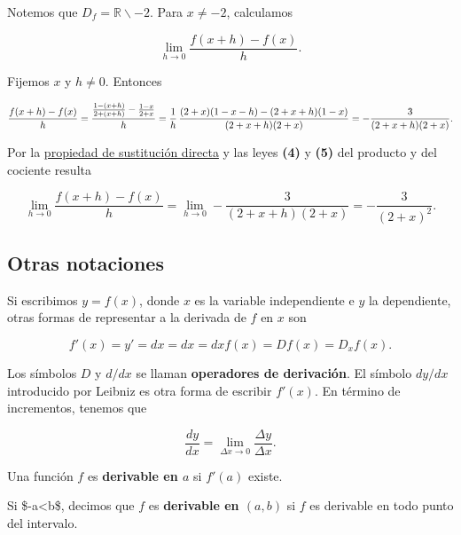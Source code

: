 \documentclass[
  letterpaper,
]{book}
\theoremstyle{plain}
\theoremstyle{remark}
\begin{document}
\begin{tcolorbox}[enhanced jigsaw, opacityback=0, left=2mm, opacitybacktitle=0.6, toprule=.15mm, bottomrule=.15mm, colbacktitle=quarto-callout-tip-color!10!white, titlerule=0mm, bottomtitle=1mm, title=\textcolor{quarto-callout-tip-color}{\faLightbulb}\hspace{0.5em}{Solución}, toptitle=1mm, colframe=quarto-callout-tip-color-frame, colback=white, breakable, rightrule=.15mm, arc=.35mm, leftrule=.75mm, coltitle=black]

Notemos que \(D_f=\mathbb{R}\backslash {-2}\). Para \(x\neq -2\),
calculamos

\[
\lim_{h\to 0} \frac{f(x+h)-f(x)}{h}.
\]

Fijemos \(x\) y \(h\neq 0\). Entonces

\[ \small
\frac{f(x+h)-f(x)}{h}=\frac{\frac{1-(x+h)}{2+(x+h)}-\frac{1-x}{2+x}}{h}=\frac{1}{h}\, \frac{(2+x)(1-x-h)-(2+x+h)(1-x)}{(2+x+h)(2+x)}=-\frac{3}{(2+x+h)(2+x)}.
\]

Por la \hyperref[teo-sust-directa]{propiedad de sustitución directa} y
las leyes \textbf{(4)} y \textbf{(5)} del producto y del cociente
resulta

\[
\lim_{h\to 0} \frac{f(x+h)-f(x)}{h}=\lim_{h\to 0} -\frac{3}{(2+x+h)(2+x)}=-\frac{3}{(2+x)^2}.
\]

\end{tcolorbox}

\subsection{Otras notaciones}\label{otras-notaciones}

Si escribimos \(y=f(x)\), donde \(x\) es la variable independiente e
\(y\) la dependiente, otras formas de representar a la derivada de \(f\)
en \(x\) son

\[
f'(x)=y'={dx}={dx}={dx}f(x)=Df(x)=D_xf(x).
\]

Los símbolos \(D\) y \(d/dx\) se llaman \textbf{operadores de
derivación}. El símbolo \(dy/dx\) introducido por Leibniz es otra forma
de escribir \(f'(x)\). En término de incrementos, tenemos que

\[
\frac{dy}{dx}=\lim_{\Delta x\to 0} \frac{\Delta y}{\Delta x}.
\]

\begin{tcolorbox}[enhanced jigsaw, opacityback=0, left=2mm, opacitybacktitle=0.6, toprule=.15mm, bottomrule=.15mm, colbacktitle=quarto-callout-note-color!10!white, titlerule=0mm, bottomtitle=1mm, title=\textcolor{quarto-callout-note-color}{\faInfo}\hspace{0.5em}{Definición (Función derivable)}, toptitle=1mm, colframe=quarto-callout-note-color-frame, colback=white, breakable, rightrule=.15mm, arc=.35mm, leftrule=.75mm, coltitle=black]

Una función \(f\) es \textbf{derivable en \(a\)} si \(f'(a)\) existe.

Si \$-\infty\leq a\textless b\leq \infty \$, decimos que \(f\) es
\textbf{derivable en \((a,b)\)} si \(f\) es derivable en todo punto del
intervalo.

\end{tcolorbox}
\end{document}

